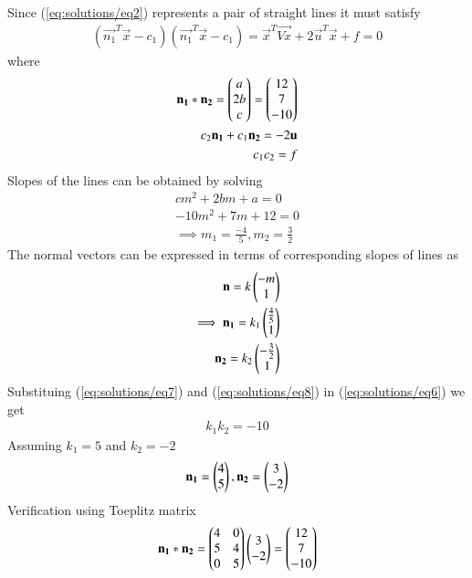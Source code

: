 \documentclass[journal,12pt,twocolumn]{IEEEtran}
\begin{document}
Since (\ref{eq:solutions/eq2}) represents a pair of straight lines it must satisfy
\begin{align}
	(\vec{n_1}^T \vec{x} - c_1)(\vec{n_1}^T \vec{x} - c_1) =
        \vec{x}^{T}\vec{Vx} + 2\vec{u}^{T}\vec{x} + f=0
\end{align}
where
\begin{align}
	\mathbf{n_1}*\mathbf{n_2}=\begin{pmatrix}a\\2b\\c\end{pmatrix}=\begin{pmatrix}12\\7\\-10\end{pmatrix} \label{eq:solutions/eq6} \\ 
	c_2\mathbf{n_1}+c_1\mathbf{n_2}=-2\mathbf{u} \label{eq:solutions/eq9}\\
	c_1c_2=f
\end{align}
Slopes of the lines can be obtained by solving 
\begin{align}
	cm^2+2bm+a=0 \\
	-10m^2+7m+12=0 \\
	\implies m_1 = \frac{-4}{5}, m_2 = \frac{3}{2}
\end{align}
The normal vectors can be expressed in terms of corresponding slopes of lines as
\begin{align}
	\mathbf{n}=k\begin{pmatrix}-m\\1\end{pmatrix} \\
	\implies
	\mathbf{n_1}=k_1\begin{pmatrix}\frac{4}{5} \\ 1\end{pmatrix}  \label{eq:solutions/eq7} \\
	\mathbf{n_2}=k_2\begin{pmatrix}-\frac{3}{2} \\ 1\end{pmatrix}  \label{eq:solutions/eq8}
\end{align}
Substituing (\ref{eq:solutions/eq7}) and (\ref{eq:solutions/eq8}) in (\ref{eq:solutions/eq6}) we get
\begin{align}
	k_1k_2=-10
\end{align}
Assuming $ k_1=5$ and $k_2 =-2$
\begin{align}
	\mathbf{n_1}=\begin{pmatrix}4\\5\end{pmatrix}, \mathbf{n_2}=\begin{pmatrix}3\\-2\end{pmatrix}
\end{align}
Verification using Toeplitz matrix
\begin{align}
\mathbf{n_1}*\mathbf{n_2}=\begin{pmatrix}4 & 0 \\ 5 & 4 \\0 & 5\end{pmatrix}\begin{pmatrix}3\\-2\end{pmatrix}=\begin{pmatrix}12\\7\\-10\end{pmatrix}
\end{align}
\end{document}

